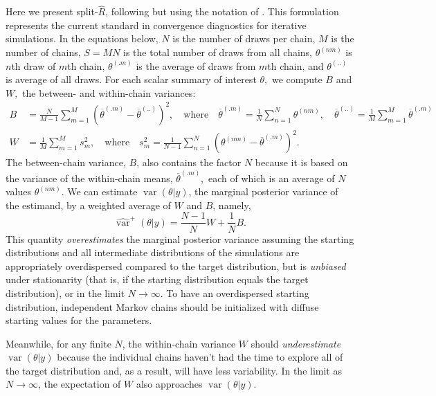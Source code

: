 \documentclass[american,]{article}
\DeclareMathOperator{\var}{var}
\theoremstyle{definition}
\begin{document}
Here we present split-\(\widehat{R}\),
following \citet{BDA3} but using the notation of
\citet{StanManual.2.18.0}. This formulation represents the current 
standard in convergence diagnostics for iterative simulations. In the
equations below, \(N\) is the number of draws per chain, \(M\) is the
number of chains, \(S=MN\) is the total number of draws from all
chains, \(\theta^{(nm)}\) is $n$th draw of $m$th chain,
\(\theta^{(.m)}\) is the average of draws from $m$th chain, and
\(\theta^{(..)}\) is average of all draws. For each scalar summary of
interest \(\theta,\) we compute \(B\) and \(W,\) the between- and
within-chain variances:
\begin{align}
B &= \frac{N}{M-1}\sum_{m=1}^{M}(\overline{\theta}^{(.m)} - 
\overline{\theta}^{(..)})^2, \quad \mbox{where} \quad 
\overline{\theta}^{(.m)}=\frac{1}{N}\sum_{n=1}^N \theta^{(nm)}, \quad
\overline{\theta}^{(..)} = \frac{1}{M}\sum_{m=1}^M\overline{\theta}^{(.m)} 
\\
W &= \frac{1}{M}\sum_{m=1}^{M}s_m^2, \quad \mbox{where} \quad
s_m^2=\frac{1}{N-1} \sum_{n=1}^N (\theta^{(nm)}-\overline{\theta}^{(.m)})^2.
\end{align}
The between-chain variance, \(B\), also contains the factor \(N\)
because it is based on the variance of the within-chain means,
\(\overline{\theta}^{(.m)},\) each of which is an average of \(N\)
values \(\theta^{(nm)}\). We can estimate \(\var(\theta | y)\),
the marginal posterior variance of the estimand, by a weighted average
of \(W\) and \(B\), namely,
\begin{equation}
\widehat{\var}^+(\theta| y) = \frac{N-1}{N}W + \frac{1}{N}B.
\end{equation}
This quantity \emph{overestimates} the marginal posterior variance
assuming the starting distributions and all intermediate distributions
of the simulations are appropriately
overdispersed compared to the target distribution, but is
\emph{unbiased} under stationarity (that is, if the starting
distribution equals the target distribution), or in the limit
\(N\rightarrow\infty\). To have an overdispersed starting distribution,
independent Markov chains should be initialized with diffuse starting
values for the parameters. 

Meanwhile, for any finite \(N\), the within-chain variance \(W\) should
\emph{underestimate} \(\var(\theta |y)\) because the
individual chains haven't had the time to explore all of the target
distribution and, as a result, will have less variability. In the limit
as \(N\rightarrow\infty\), the expectation of \(W\) also approaches
\(\var(\theta |y)\).
\end{document}
